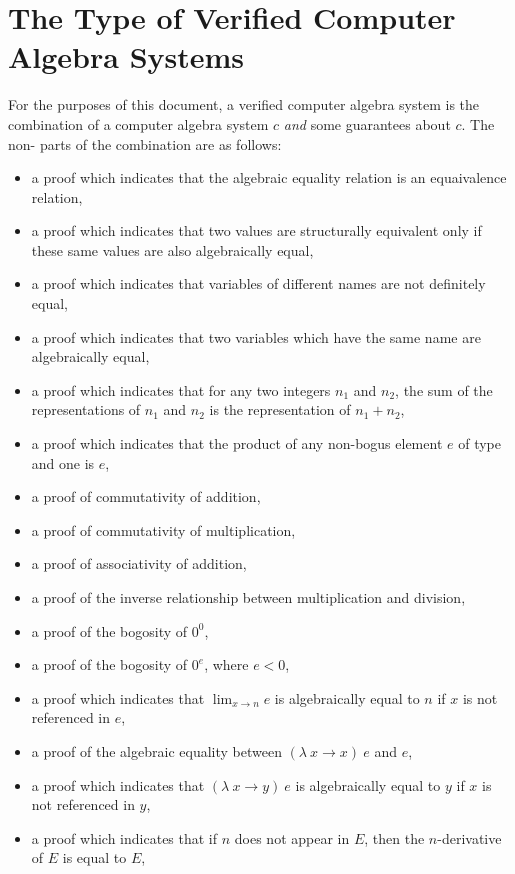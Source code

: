 \documentclass{report}
\begin{document}
\section{The Type of Verified Computer Algebra Systems}
For the purposes of this document, a verified computer algebra system is the combination of a  computer algebra system \(c\) \emph{and} some guarantees about \(c\).  The non- parts of the combination are as follows:

\begin{itemize}
 \item a proof which indicates that the algebraic equality relation is an equaivalence relation,
 \item a proof which indicates that two values are structurally equivalent only if these same values are also algebraically equal,
 \item a proof which indicates that variables of different names are not definitely equal,
 \item a proof which indicates that two variables which have the same name are algebraically equal,
 \item a proof which indicates that for any two integers \(n_1\) and \(n_2\), the sum of the representations of \(n_1\) and \(n_2\) is the representation of \(n_1 + n_2\),
 \item a proof which indicates that the product of any non-bogus element \(e\) of type  and one is \(e\),
 \item a proof of commutativity of addition,
 \item a proof of commutativity of multiplication,
 \item a proof of associativity of addition,
 \item a proof of the inverse relationship between multiplication and division,
 \item a proof of the bogosity of \(0^0\),
 \item a proof of the bogosity of \(0^e\), where \(e < 0\),
 \item a proof which indicates that \(\lim_{x \rightarrow n} e\) is algebraically equal to \(n\) if \(x\) is not referenced in \(e\),
 \item a proof of the algebraic equality between \(\left(\lambda\ x \rightarrow x\right)\ e\) and \(e\),
 \item a proof which indicates that \(\left(\lambda\ x \rightarrow y\right)\ e\) is algebraically equal to \(y\) if \(x\) is not referenced in \(y\),
 \item a proof which indicates that if \(n\) does not appear in \(E\), then the \(n\)-derivative of \(E\) is equal to \(E\),

\end{itemize}
\end{document}
